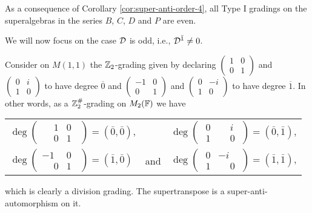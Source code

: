 \documentclass{amsbook}
\begin{document}
As a consequence of Corollary \ref{cor:super-anti-order-4}, all Type I gradings on the superalgebras in the series $B$, $C$, $D$ and $P$ are even.

We will now focus on the case $\mathcal{D}$ is odd, i.e., $\mathcal{D}^{\bar1} \neq 0$.

\begin{ex}\label{ex:supertransp-graded}
    Consider on $M(1,1)$ the $\mathbb{Z}_2$-grading given by declaring $\begin{pmatrix}
       1 & 0 \\
       0 & 1
     \end{pmatrix}$ and
     $\begin{pmatrix}
       0 & i \\
       1 & 0
     \end{pmatrix}$ to have degree $\overline 0$ and
     $\begin{pmatrix}
       -1 & 0 \\
       0 & 1
     \end{pmatrix}$ and
     $\begin{pmatrix}
       0 & -i \\
       1 & 0
     \end{pmatrix}$ to have degree $\overline 1$. In other words, as a $\mathbb{Z}_2^\#$-grading on $M_2(\mathbb{F})$ we have\\
     \begin{center}
     \begin{tabular}{ l c r }
     $\deg \begin{pmatrix}
      \phantom{-}1 & 0\phantom{..} \\
      \phantom{-}0 & 1\phantom{..}
     \end{pmatrix} = (\bar 0, \bar 0)$, && $\deg \begin{pmatrix}
      \phantom{.}0 & \phantom{-}i\phantom{.} \\
      \phantom{.}1 & \phantom{-}0\phantom{.}
     \end{pmatrix} = (\bar 0, \bar 1)$,\\
     $\deg \begin{pmatrix}
      -1 & 0\phantom{..} \\
       \phantom{-}0 & 1\phantom{..}
     \end{pmatrix} = (\bar 1, \bar 0)$ &
     and
     & $\deg \begin{pmatrix}
      \phantom{.}0 & -i\phantom{.} \\
      \phantom{.}1 & \phantom{-}0\phantom{.}
     \end{pmatrix} = (\bar 1, \bar 1)$,
     \end{tabular}
     \end{center}
     which is clearly a division grading. The supertranspose is a super-anti-automorphism on it.
\end{ex}
\end{document}
